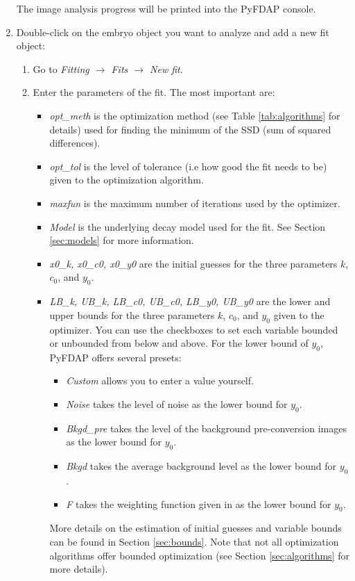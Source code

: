\documentclass[a4paper,11pt]{article}
\begin{document}
\begin{enumerate}
\begin{figure}[H]
 \end{figure}
 The image analysis progress will be printed into the PyFDAP console.
\item Double-click on the embryo object you want to analyze and add a new fit object:
\begin{enumerate}
 \item Go to \textit{Fitting $\rightarrow$ Fits $\rightarrow$ New fit}.
 \item Enter the parameters of the fit. The most important are:
\begin{itemize}
 \item \textit{opt\_meth} is the optimization method (see Table \ref{tab:algorithms} for details) used for finding the minimum of the SSD (sum of squared differences).
 \item \textit{opt\_tol} is the level of tolerance (i.e how good the fit needs to be) given to the optimization algorithm.
 \item \textit{maxfun} is the maximum number of iterations used by the optimizer.
 \item \textit{Model} is the underlying decay model used for the fit. See Section \ref{sec:models} for more information.
 \item \textit{x0\_k, x0\_c0, x0\_y0} are the initial guesses for the three parameters $k$, $c_0$, and $y_0$.
 \item \textit{LB\_k, UB\_k, LB\_c0, UB\_c0, LB\_y0, UB\_y0} are the lower and upper bounds for the three parameters $k$, $c_0$, and $y_0$ given to the optimizer. You can use the checkboxes to set each variable bounded or unbounded from below and above. For the lower bound of $y_0$, PyFDAP offers several presets:
 \begin{itemize}
 \item \textit{Custom} allows you to enter a value yourself.
 \item \textit{Noise} takes the level of noise as the lower bound for $y_0$. 
 \item \textit{Bkgd\_pre} takes the level of the background pre-conversion images as the lower bound for $y_0$. 
 \item \textit{Bkgd} takes the average background level as the lower bound for $y_0$. 
 \item \textit{F} takes the weighting function given in \cite{Mueller2012} as the lower bound for $y_0$. 
\end{itemize}
More details on the estimation of initial guesses and variable bounds can be found in Section \ref{sec:bounds}. Note that not all optimization algorithms offer bounded optimization (see Section \ref{sec:algorithms} for more details). 

\end{itemize}
\end{enumerate}
\end{enumerate}
\end{document}

